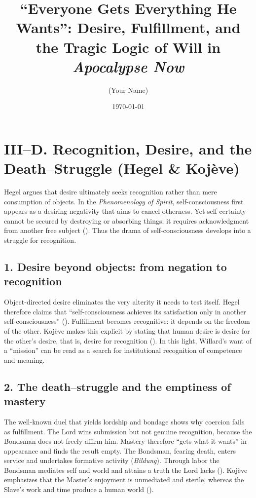 \documentclass[12pt]{article}
\title{“Everyone Gets Everything He Wants”: Desire, Fulfillment, and the Tragic Logic of Will in \textit{Apocalypse Now}}
\author{(Your Name)}
\date{\today}
\begin{document}
\maketitle

\section*{III--D. Recognition, Desire, and the Death--Struggle (Hegel \& Koj{\`e}ve)}

Hegel argues that desire ultimately seeks recognition rather than mere consumption of objects. In the \emph{Phenomenology of Spirit}, self-consciousness first appears as a desiring negativity that aims to cancel otherness. Yet self-certainty cannot be secured by destroying or absorbing things; it requires acknowledgment from another free subject (\parencite[§§ 167--175]{HegelPhenomenology1977}). Thus the drama of self-consciousness develops into a struggle for recognition.

\subsection*{1. Desire beyond objects: from negation to recognition}
Object-directed desire eliminates the very alterity it needs to test itself. Hegel therefore claims that ``self-consciousness achieves its satisfaction only in another self-consciousness'' (\parencite{HegelPhenomenology1977}). Fulfillment becomes recognitive: it depends on the freedom of the other. Koj{\`e}ve makes this explicit by stating that human desire is desire for the other's desire, that is, desire for recognition (\parencite[p.~6]{KojeveIRH1980}). In this light, Willard's want of a ``mission'' can be read as a search for institutional recognition of competence and meaning.

\subsection*{2. The death--struggle and the emptiness of mastery}
The well-known duel that yields lordship and bondage shows why coercion fails as fulfillment. The Lord wins submission but not genuine recognition, because the Bondsman does not freely affirm him. Mastery therefore ``gets what it wants'' in appearance and finds the result empty. The Bondsman, fearing death, enters service and undertakes formative activity (\emph{Bildung}). Through labor the Bondsman mediates self and world and attains a truth the Lord lacks (\parencite[\S 175]{HegelPhenomenology1977}). Koj{\`e}ve emphasizes that the Master's enjoyment is unmediated and sterile, whereas the Slave's work and time produce a human world (\parencite{KojeveIRH1980}).
\end{document}
